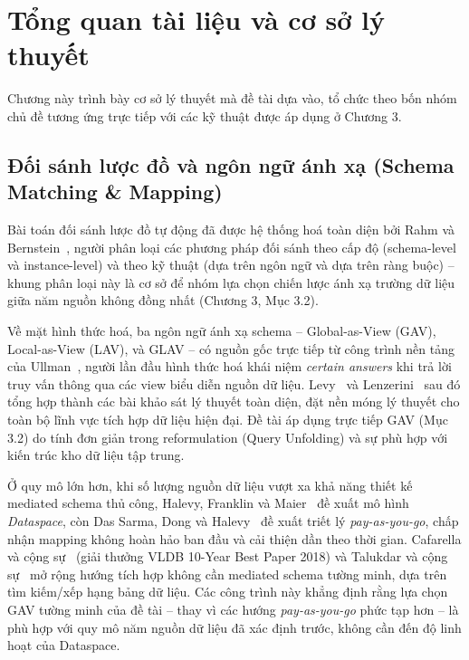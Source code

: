 \documentclass[12pt,a4paper]{report}
\begin{document}
\chapter{Tổng quan tài liệu và cơ sở lý thuyết}

Chương này trình bày cơ sở lý thuyết mà đề tài dựa vào, tổ chức theo bốn nhóm chủ đề tương ứng trực tiếp với các kỹ thuật được áp dụng ở Chương 3.

\section{Đối sánh lược đồ và ngôn ngữ ánh xạ (Schema Matching \& Mapping)}

Bài toán đối sánh lược đồ tự động đã được hệ thống hoá toàn diện bởi Rahm và Bernstein~\cite{rahm2001survey}, người phân loại các phương pháp đối sánh theo cấp độ (schema-level và instance-level) và theo kỹ thuật (dựa trên ngôn ngữ và dựa trên ràng buộc) -- khung phân loại này là cơ sở để nhóm lựa chọn chiến lược ánh xạ trường dữ liệu giữa năm nguồn không đồng nhất (Chương 3, Mục 3.2).

Về mặt hình thức hoá, ba ngôn ngữ ánh xạ schema -- Global-as-View (GAV), Local-as-View (LAV), và GLAV -- có nguồn gốc trực tiếp từ công trình nền tảng của Ullman~\cite{ullman1997logical}, người lần đầu hình thức hoá khái niệm \emph{certain answers} khi trả lời truy vấn thông qua các view biểu diễn nguồn dữ liệu. Levy~\cite{levy2001survey} và Lenzerini~\cite{lenzerini2002theoretical} sau đó tổng hợp thành các bài khảo sát lý thuyết toàn diện, đặt nền móng lý thuyết cho toàn bộ lĩnh vực tích hợp dữ liệu hiện đại. Đề tài áp dụng trực tiếp GAV (Mục 3.2) do tính đơn giản trong reformulation (Query Unfolding) và sự phù hợp với kiến trúc kho dữ liệu tập trung.

Ở quy mô lớn hơn, khi số lượng nguồn dữ liệu vượt xa khả năng thiết kế mediated schema thủ công, Halevy, Franklin và Maier~\cite{halevy2006dataspace} đề xuất mô hình \emph{Dataspace}, còn Das Sarma, Dong và Halevy~\cite{dassarma2008payasyougo} đề xuất triết lý \emph{pay-as-you-go}, chấp nhận mapping không hoàn hảo ban đầu và cải thiện dần theo thời gian. Cafarella và cộng sự~\cite{cafarella2008webtables} (giải thưởng VLDB 10-Year Best Paper 2018) và Talukdar và cộng sự~\cite{talukdar2008learning} mở rộng hướng tích hợp không cần mediated schema tường minh, dựa trên tìm kiếm/xếp hạng bảng dữ liệu. Các công trình này khẳng định rằng lựa chọn GAV tường minh của đề tài -- thay vì các hướng \emph{pay-as-you-go} phức tạp hơn -- là phù hợp với quy mô năm nguồn dữ liệu đã xác định trước, không cần đến độ linh hoạt của Dataspace.
\end{document}
